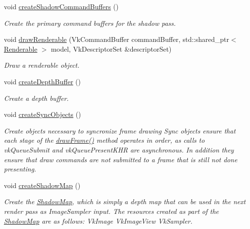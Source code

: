 \begin{DoxyCompactItemize}
void \mbox{\hyperlink{class_render_system_ad2e1bc7f9df303cc2ee02a6677a99ebb}{create\+Shadow\+Command\+Buffers}} ()
\begin{DoxyCompactList}\small\item\em Create the primary command buffers for the shadow pass. \end{DoxyCompactList}\item 
void \mbox{\hyperlink{class_render_system_a6b91a5694d7220da53c8826155f6470d}{draw\+Renderable}} (Vk\+Command\+Buffer command\+Buffer, std\+::shared\+\_\+ptr$<$ \mbox{\hyperlink{class_renderable}{Renderable}} $>$ model, Vk\+Descriptor\+Set \&descriptor\+Set)
\begin{DoxyCompactList}\small\item\em Draw a renderable object. \end{DoxyCompactList}\item 
\mbox{\label{class_render_system_ab8787f0e229b21cacb8af3437423fed7}} 
void \mbox{\hyperlink{class_render_system_ab8787f0e229b21cacb8af3437423fed7}{create\+Depth\+Buffer}} ()
\begin{DoxyCompactList}\small\item\em Create a depth buffer. \end{DoxyCompactList}\item 
\mbox{\label{class_render_system_ae7c7581bfbcc743a8ed8106ff44b4998}} 
void \mbox{\hyperlink{class_render_system_ae7c7581bfbcc743a8ed8106ff44b4998}{create\+Sync\+Objects}} ()
\begin{DoxyCompactList}\small\item\em Create objects necessary to syncronize frame drawing Sync objects ensure that each stage of the \mbox{\hyperlink{class_render_system_a4bc6523a059eacee7fb4dd20657c4713}{draw\+Frame()}} method operates in order, as calls to vk\+Queue\+Submit and vk\+Queue\+Present\+K\+HR are asynchronous. In addition they ensure that draw commands are not submitted to a frame that is still not done presenting. \end{DoxyCompactList}\item 
\mbox{\label{class_render_system_afdb2169091433ee0c10ef581b646ac9f}} 
void \mbox{\hyperlink{class_render_system_afdb2169091433ee0c10ef581b646ac9f}{create\+Shadow\+Map}} ()
\begin{DoxyCompactList}\small\item\em Create the \mbox{\hyperlink{struct_shadow_map}{Shadow\+Map}}, which is simply a depth map that can be used in the next render pass as Image\+Sampler input. The resources created as part of the \mbox{\hyperlink{struct_shadow_map}{Shadow\+Map}} are as follows\+: Vk\+Image Vk\+Image\+View Vk\+Sampler. \end{DoxyCompactList}\item 

\end{DoxyCompactItemize}
